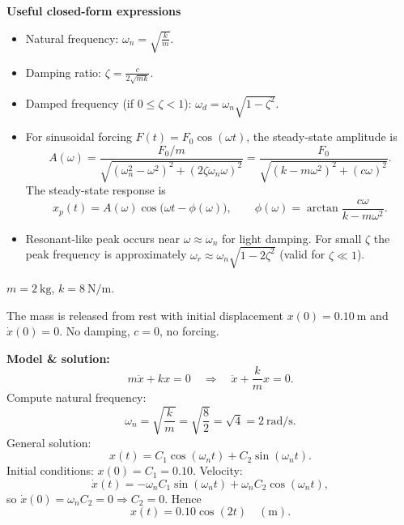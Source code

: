     \textbf{Useful closed-form expressions}

    \begin{itemize}
      \item Natural frequency: \(\displaystyle \omega_n=\sqrt{\frac{k}{m}}\).
      \item Damping ratio: \(\displaystyle \zeta=\frac{c}{2\sqrt{mk}}\).
      \item Damped frequency (if \(0\le\zeta<1\)): \(\displaystyle \omega_d=\omega_n\sqrt{1-\zeta^2}\).
      \item For sinusoidal forcing \(F(t)=F_0\cos(\omega t)\), the steady-state amplitude is
        \[
          A(\omega)=\frac{F_0/m}{\sqrt{(\omega_n^2-\omega^2)^2 + (2\zeta\omega_n\omega)^2}}
          =\frac{F_0}{\sqrt{(k-m\omega^2)^2 + (c\omega)^2}}.
        \]
        The steady-state response is
        \[
          x_p(t)=A(\omega)\cos\big(\omega t - \phi(\omega)\big),
          \qquad \phi(\omega)=\arctan\!\frac{c\omega}{k-m\omega^2}.
        \]
      \item Resonant-like peak occurs near \(\omega\approx\omega_n\) for light damping. For small \(\zeta\) the peak frequency is approximately \(\omega_r\approx\omega_n\sqrt{1-2\zeta^2}\) (valid for \(\zeta\ll1\)).
    \end{itemize}

    \begin{example}
      \(m=2\ \text{kg}\), \(k=8\ \text{N/m}\). 

      The mass is released from rest with initial displacement \(x(0)=0.10\ \text{m}\) and \(\dot x(0)=0\). No damping, \(c=0\), no forcing.

      \textbf{Model \& solution:}
      \[
      m\ddot x + kx =0 \quad\Rightarrow\quad \ddot x + \frac{k}{m}x = 0.
      \]
      Compute natural frequency:
      \[
      \omega_n = \sqrt{\frac{k}{m}} = \sqrt{\frac{8}{2}} = \sqrt{4} = 2\ \text{rad/s}.
      \]
      General solution:
      \[
      x(t) = C_1\cos(\omega_n t) + C_2\sin(\omega_n t).
      \]
      Initial conditions: \(x(0)=C_1=0.10\). Velocity:
      \[
      \dot x(t) = -\omega_n C_1\sin(\omega_n t) + \omega_n C_2\cos(\omega_n t),
      \]
      so \(\dot x(0) = \omega_n C_2 = 0 \Rightarrow C_2=0\). Hence
      \[
      \boxed{\,x(t) = 0.10\cos(2t)\quad(\text{m}).\,}
      \]
    \end{example}


